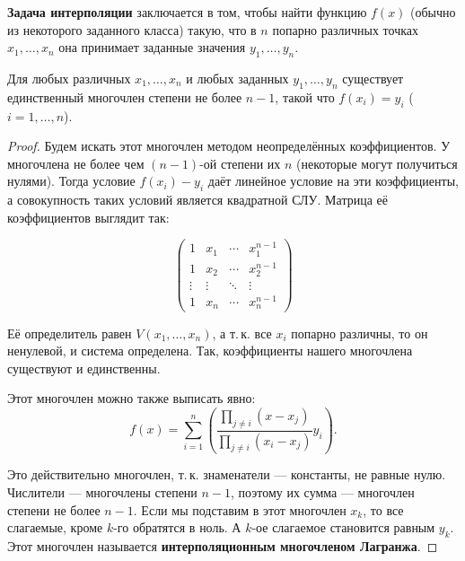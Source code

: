 \textbf{Задача интерполяции} заключается в том, чтобы найти функцию $f(x)$ (обычно из некоторого заданного класса) такую, что в $n$ попарно различных точках $x_1, \ldots, x_n$ она принимает заданные значения $y_1, \ldots, y_n$.

\begin{theorem}
    Для любых различных $x_1, \ldots, x_n$ и любых заданных $y_1, \ldots, y_n$ существует единственный многочлен степени не более $n - 1$, такой что $f(x_i) = y_i$ ($i = 1, \ldots, n$).
\end{theorem}

\begin{proof}
    Будем искать этот многочлен методом неопределённых коэффициентов. У многочлена не более чем $(n - 1)$-ой степени их $n$ (некоторые могут получиться нулями). Тогда условие $f(x_i) - y_i$ даёт линейное условие на эти коэффициенты, а совокупность таких условий является квадратной СЛУ. Матрица её коэффициентов выглядит так:
    
    \noindent
    \begin{minipage}{.3\textwidth}
    $$
    \begin{pmatrix}
        1 & x_1 & \cdots & x_1^{n - 1}\\
        1 & x_2 & \cdots & x_2^{n - 1}\\
        \vdots & \vdots & \ddots & \vdots\\
        1 & x_n & \cdots & x_n^{n - 1}
    \end{pmatrix}
    $$
    \end{minipage}
    \begin{minipage}[b]{.7\textwidth}\setlength{\parindent}{17pt}
        Её определитель равен $V(x_1, \ldots, x_n)$, а т.\,к. все $x_i$ попарно различны, то он ненулевой, и система определена. Так, коэффициенты нашего многочлена существуют и единственны.
    \end{minipage}

    Этот многочлен можно также выписать явно:
    $$
    f(x) = \sum_{i = 1}^n\left(\frac{\prod\limits_{j \ne i}(x - x_j)}{\prod\limits_{j \ne i}(x_i - x_j)}y_i\right).
    $$

    Это действительно многочлен, т.\,к. знаменатели --- константы, не равные нулю. Числители --- многочлены степени $n - 1$, поэтому их сумма --- многочлен степени не более $n - 1$. Если мы подставим в этот многочлен $x_k$, то все слагаемые, кроме $k$-го обратятся в ноль. А $k$-ое слагаемое становится равным $y_k$. Этот многочлен называется \textbf{интерполяционным многочленом Лагранжа}.
\end{proof}

